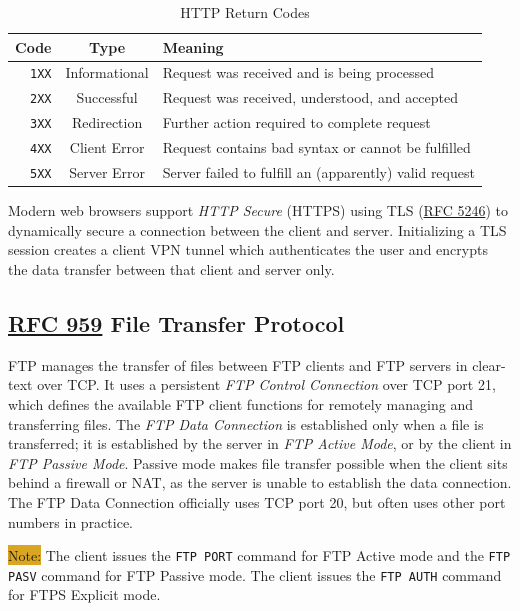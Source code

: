 \documentclass[12pt]{article}
\newcommand{\note}[1]{\colorbox{#1}{Note:}}
\newcommand{\RFC}[1]{\href{https://datatracker.ietf.org/doc/html/rfc#1}{RFC #1}}
\begin{document}
	\begin{table}[H]
	\centering
	\caption{HTTP Return Codes \label{tab:HTTP CODES}}
	\begin{tabular}{r | c | l}
	\hline
	\textbf{Code}	& \textbf{Type}	& \textbf{Meaning}\\\hline
	\texttt{1XX}			& Informational			& Request was received and is being processed\\\hline
	\texttt{2XX}			& Successful			& Request was received, understood, and accepted\\\hline
	\texttt{3XX}			& Redirection			& Further action required to complete request\\\hline
	\texttt{4XX}			& Client Error			& Request contains bad syntax or cannot be fulfilled\\\hline
	\texttt{5XX}			& Server Error			& Server failed to fulfill an (apparently) valid request\\\hline
	\end{tabular}\end{table}
	Modern web browsers support \textit{HTTP Secure} (HTTPS) using TLS (\RFC{5246}) to dynamically secure a connection between the client and server. Initializing a TLS session creates a client VPN tunnel which authenticates the user and encrypts the data transfer between that client and server only.


	\subsection{\RFC{959} File Transfer Protocol \label{subsec:FTP}}
	FTP manages the transfer of files between FTP clients and FTP servers in clear-text over TCP. It uses a persistent \textit{FTP Control Connection} over TCP port 21, which defines the available FTP client functions for remotely managing and transferring files. The \textit{FTP Data Connection} is established only when a file is transferred; it is established by the server in \textit{FTP Active Mode}, or by the client in \textit{FTP Passive Mode}. Passive mode makes file transfer possible when the client sits behind a firewall or NAT, as the server is unable to establish the data connection. The FTP Data Connection officially uses TCP port 20, but often uses other port numbers in practice.

	\note{Goldenrod} The client issues the \texttt{FTP PORT} command for FTP Active mode and the \texttt{FTP PASV} command for FTP Passive mode. The client issues the \texttt{FTP AUTH} command for FTPS Explicit mode.
	
\end{document}
